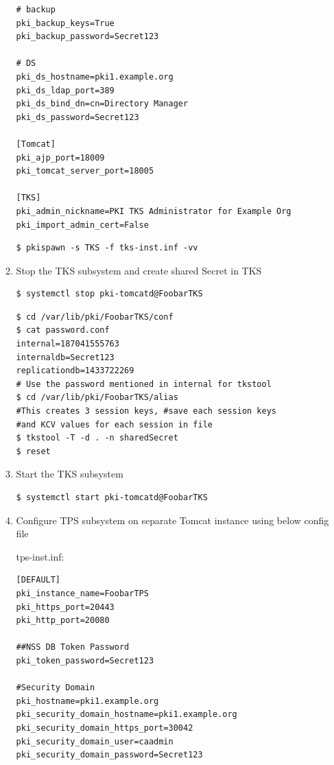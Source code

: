 \documentclass[a4paper]{article}
\begin{document}
\begin{enumerate}[label*=\arabic*.]
\begin{enumerate}[label*=\arabic*.]
\begin{lstlisting}[style=configFile]
# backup
pki_backup_keys=True
pki_backup_password=Secret123

# DS
pki_ds_hostname=pki1.example.org
pki_ds_ldap_port=389
pki_ds_bind_dn=cn=Directory Manager
pki_ds_password=Secret123

[Tomcat]
pki_ajp_port=18009
pki_tomcat_server_port=18005

[TKS]
pki_admin_nickname=PKI TKS Administrator for Example Org
pki_import_admin_cert=False
            \end{lstlisting}
            \begin{lstlisting}[style=bashInputStyle]
$ pkispawn -s TKS -f tks-inst.inf -vv
            \end{lstlisting}
            \item Stop the TKS subsystem and create shared Secret in TKS
                \begin{lstlisting}[style=bashInputStyle]
$ systemctl stop pki-tomcatd@FoobarTKS                
                \end{lstlisting}
                \begin{lstlisting}[style=bashInputStyle]
$ cd /var/lib/pki/FoobarTKS/conf
$ cat password.conf
internal=187041555763
internaldb=Secret123
replicationdb=1433722269
# Use the password mentioned in internal for tkstool
$ cd /var/lib/pki/FoobarTKS/alias
#This creates 3 session keys, #save each session keys
#and KCV values for each session in file
$ tkstool -T -d . -n sharedSecret
$ reset
                \end{lstlisting}
            \item Start the TKS subsystem 
            \begin{lstlisting}[style=bashInputStyle]                
$ systemctl start pki-tomcatd@FoobarTKS            
            \end{lstlisting}
            \item Configure TPS subsystem on separate Tomcat instance using below config file

            tps-inst.inf:
            \begin{lstlisting}[style=configFile]
[DEFAULT]
pki_instance_name=FoobarTPS
pki_https_port=20443
pki_http_port=20080

##NSS DB Token Password
pki_token_password=Secret123

#Security Domain
pki_hostname=pki1.example.org
pki_security_domain_hostname=pki1.example.org
pki_security_domain_https_port=30042
pki_security_domain_user=caadmin
pki_security_domain_password=Secret123


\end{lstlisting}
\end{enumerate}
\end{enumerate}
\end{document}
